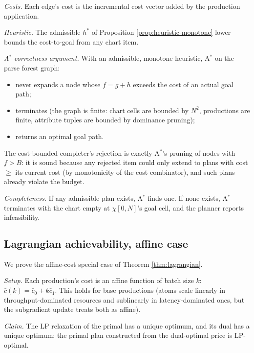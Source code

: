\emph{Costs.} Each edge's cost is the incremental
cost vector added by the production application.

\emph{Heuristic.} The admissible $h^*$ of
Proposition \ref{prop:heuristic-monotone} lower
bounds the cost-to-goal from any chart item.

\emph{A$^*$ correctness argument.} With an
admissible, monotone heuristic, A$^*$ on the parse
forest graph:
\begin{itemize}[nosep]
  \item never expands a node whose $f = g + h$
    exceeds the cost of an actual goal path;
  \item terminates (the graph is finite: chart cells
    are bounded by $N^2$, productions are finite,
    attribute tuples are bounded by dominance
    pruning);
  \item returns an optimal goal path.
\end{itemize}

The cost-bounded completer's rejection is exactly
A$^*$'s pruning of nodes with $f > B$: it is sound
because any rejected item could only extend to
plans with cost $\geq$ its current cost (by
monotonicity of the cost combinator), and such
plans already violate the budget.

\emph{Completeness.} If any admissible plan exists,
A$^*$ finds one. If none exists, A$^*$ terminates
with the chart empty at $\chi[0, N]$'s goal cell,
and the planner reports infeasibility.

\subsection{Lagrangian achievability, affine case}
\label{app:b-lagrangian}

We prove the affine-cost special case of Theorem
\ref{thm:lagrangian}.

\emph{Setup.} Each production's cost is an affine
function of batch size $k$: $\bar{c}(k) = \bar{c}_0
+ k \bar{c}_1$. This holds for base productions
(atoms scale linearly in throughput-dominated
resources and sublinearly in latency-dominated
ones, but the subgradient update treats both as
affine).

\emph{Claim.} The LP relaxation of the primal
has a unique optimum, and its dual has a unique
optimum; the primal plan constructed from the
dual-optimal price is LP-optimal.

